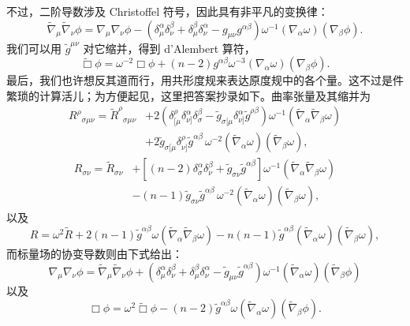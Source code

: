不过，二阶导数涉及 Christoffel 符号，因此具有非平凡的变换律：
\begin{equation*}
\widetilde{\nabla}_{\mu}\widetilde{\nabla}_{\nu}\phi = \nabla_{\mu}\nabla_{\nu}\phi - \left(\delta^{\alpha}_{\mu}\delta^{\beta}_{\nu} + \delta^{\beta}_{\mu}\delta^{\alpha}_{\nu} - g_{\mu\nu}g^{\alpha\beta}\right)\omega^{-1}(\nabla_{\alpha}\omega)(\nabla_{\beta}\phi).
\tag{G.12}
\end{equation*}
我们可以用 $\tilde{g}^{\mu\nu}$ 对它缩并，得到 d'Alembert 算符，
\begin{equation*}
\widetilde{\Box}\phi = \omega^{-2}\Box\phi + (n-2)g^{\alpha\beta}\omega^{-3}(\nabla_{\alpha}\omega)(\nabla_{\beta}\phi).
\tag{G.13}
\end{equation*}
最后，我们也许想反其道而行，用共形度规来表达原度规中的各个量。这不过是件繁琐的计算活儿；为方便起见，这里把答案抄录如下。曲率张量及其缩并为
\begin{align*}
R^{\rho}{}_{\sigma\mu\nu} = \widetilde{R}^{\rho}{}_{\sigma\mu\nu} &+ 2\left(\delta^{\rho}_{[\mu}\delta^{\alpha}_{\nu]}\delta^{\beta}_{\sigma} - \tilde{g}_{\sigma[\mu}\delta^{\alpha}_{\nu]}\tilde{g}^{\rho\beta}\right)\omega^{-1}(\widetilde{\nabla}_{\alpha}\widetilde{\nabla}_{\beta}\omega) \\
&+ 2\tilde{g}_{\sigma[\mu}\delta^{\rho}_{\nu]}\tilde{g}^{\alpha\beta}\,\omega^{-2}(\widetilde{\nabla}_{\alpha}\omega)(\widetilde{\nabla}_{\beta}\omega),
\tag{G.14}
\end{align*}
\begin{align*}
R_{\sigma\nu} = \widetilde{R}_{\sigma\nu} &+ \left[(n-2)\delta^{\alpha}_{\sigma}\delta^{\beta}_{\nu} + \tilde{g}_{\sigma\nu}\tilde{g}^{\alpha\beta}\right]\omega^{-1}(\widetilde{\nabla}_{\alpha}\widetilde{\nabla}_{\beta}\omega) \\
&- (n-1)\tilde{g}_{\sigma\nu}\tilde{g}^{\alpha\beta}\,\omega^{-2}(\widetilde{\nabla}_{\alpha}\omega)(\widetilde{\nabla}_{\beta}\omega),
\tag{G.15}
\end{align*}
以及
\begin{equation*}
R = \omega^{2}\widetilde{R} + 2(n-1)\tilde{g}^{\alpha\beta}\omega(\widetilde{\nabla}_{\alpha}\widetilde{\nabla}_{\beta}\omega) - n(n-1)\tilde{g}^{\alpha\beta}(\widetilde{\nabla}_{\alpha}\omega)(\widetilde{\nabla}_{\beta}\omega),
\tag{G.16}
\end{equation*}
而标量场的协变导数则由下式给出：
\begin{equation*}
\nabla_{\mu}\nabla_{\nu}\phi = \widetilde{\nabla}_{\mu}\widetilde{\nabla}_{\nu}\phi + \left(\delta^{\alpha}_{\mu}\delta^{\beta}_{\nu} + \delta^{\beta}_{\mu}\delta^{\alpha}_{\nu} - \tilde{g}_{\mu\nu}\tilde{g}^{\alpha\beta}\right)\omega^{-1}(\widetilde{\nabla}_{\alpha}\omega)(\widetilde{\nabla}_{\beta}\phi)
\tag{G.17}
\end{equation*}
以及
\begin{equation*}
\Box\phi = \omega^{2}\widetilde{\Box}\phi - (n-2)\tilde{g}^{\alpha\beta}\omega(\widetilde{\nabla}_{\alpha}\omega)(\widetilde{\nabla}_{\beta}\phi).
\tag{G.18}
\end{equation*}

